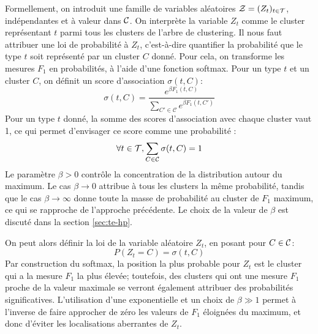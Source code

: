 Formellement, on introduit une famille de variables aléatoires $\cal{Z} = (Z_t)_{t \in \Types}$, indépendantes et à valeur dans $\Clusters$. On interprète la variable $Z_t$ comme le cluster représentant $t$ parmi tous les clusters de l'arbre de clustering. Il nous faut attribuer une loi de probabilité à $Z_t$, c'est-à-dire quantifier la probabilité que le type $t$ soit représenté par un cluster $C$ donné. Pour cela, on transforme les mesures $F_1$ en probabilités, à l'aide d'une fonction softmax. Pour un type $t$ et un cluster $C$, on définit un score d'association $\sigma(t, C)$:
\begin{equation}
    \sigma(t, C) = \frac{\displaystyle e^{ \beta F_1(t, C)}}{\displaystyle \sum_{C' \in \mathcal{C}} e^{\beta F_1(t, C')}}
\end{equation}
Pour un type $t$ donné, la somme des scores d'association avec chaque cluster vaut 1, ce qui permet d'envisager ce score comme une probabilité :
\begin{equation}
    \forall t \in \cal{T}, \sum_{C \in \cal{C}} \sigma(t, C) = 1
\end{equation}
Le paramètre $\beta > 0$ contrôle la concentration de la distribution autour du maximum. Le cas $\beta \rightarrow 0$ attribue à tous les clusters la même probabilité, tandis que le cas $\beta \rightarrow \infty$ donne toute la masse de probabilité au cluster de $F_1$ maximum, ce qui se rapproche de l'approche précédente. Le choix de la valeur de $\beta$ est discuté dans la section \ref{sec:te-hp}.

On peut alors définir la loi de la variable aléatoire $Z_t$, en posant pour $C \in \Clusters$:
\begin{equation}
    P(Z_t = C) = \sigma(t, C)
\end{equation}
Par construction du softmax, la position la plus probable pour $Z_t$ est le cluster qui a la mesure $F_1$ la plus élevée; toutefois, des clusters qui ont une mesure $F_1$ proche de la valeur maximale se verront également attribuer des probabilités significatives. L'utilisation d'une exponentielle et un choix de $\beta \gg 1$ permet à l'inverse de faire approcher de zéro les valeurs de $F_1$ éloignées du maximum, et donc d'éviter les localisations aberrantes de $Z_t$. 



